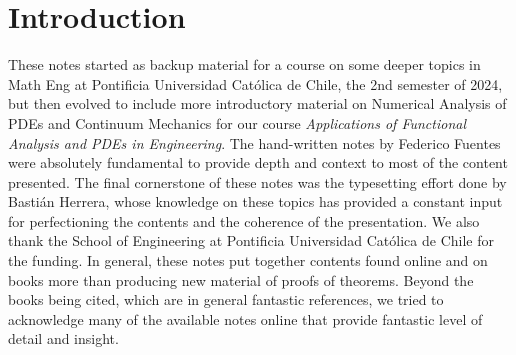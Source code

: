 \section*{Introduction}

These notes started as backup material for a course on some deeper topics in Math Eng at Pontificia Universidad Católica de Chile, the 2nd semester of 2024, but then evolved to include more introductory material on Numerical Analysis of PDEs and Continuum Mechanics for our course \emph{Applications of Functional Analysis and PDEs in Engineering}. The hand-written notes by Federico Fuentes were absolutely fundamental to provide depth and context to most of the content presented. The final cornerstone of these notes was the typesetting effort done by Bastián Herrera, whose knowledge on these topics has provided a constant input for perfectioning the contents and the coherence of the presentation. We also thank the School of Engineering at Pontificia Universidad Católica de Chile for the funding. In general, these notes put together contents found online and on books more than producing new material of proofs of theorems. Beyond the books being cited, which are in general fantastic references, we tried to acknowledge many of the available notes online that provide fantastic level of detail and insight.

